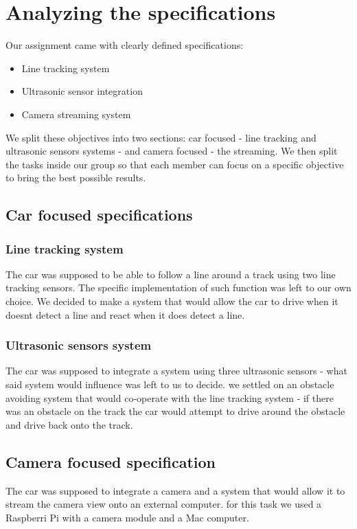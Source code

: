 \documentclass[conference]{IEEEtran}
\begin{document}
\section{Analyzing the specifications}

Our assignment came with clearly defined specifications:
\begin{itemize}
\item Line tracking system
\item Ultrasonic sensor integration
\item Camera streaming system
\end{itemize}
We split these objectives into two sections: car focused - line tracking and ultrasonic sensors systems - and camera focused - the streaming.
We then split the tasks inside our group so that each member can focus on a specific objective to bring the best possible results.


\subsection{Car focused specifications}
\subsubsection{Line tracking system}
The car was supposed to be able to follow a line around a track using two line tracking sensors. The specific implementation of such function was left to our own choice.
We decided to make a system that would allow the car to drive when it doesnt detect a line and react when it does detect a line.

\subsubsection{Ultrasonic sensors system}
The car was supposed to integrate a system using three ultrasonic sensors - what said system would influence was left to us to decide.
we settled on an obstacle avoiding system that would co-operate with the line tracking system - if there was an obstacle on the track the car
would attempt to drive around the obstacle and drive back onto the track.

\subsection{Camera focused specification}
The car was supposed to integrate a camera and a system that would allow it to stream the camera view onto an external computer.
for this task we used a Raspberri Pi with a camera module and a Mac computer.
\end{document}
